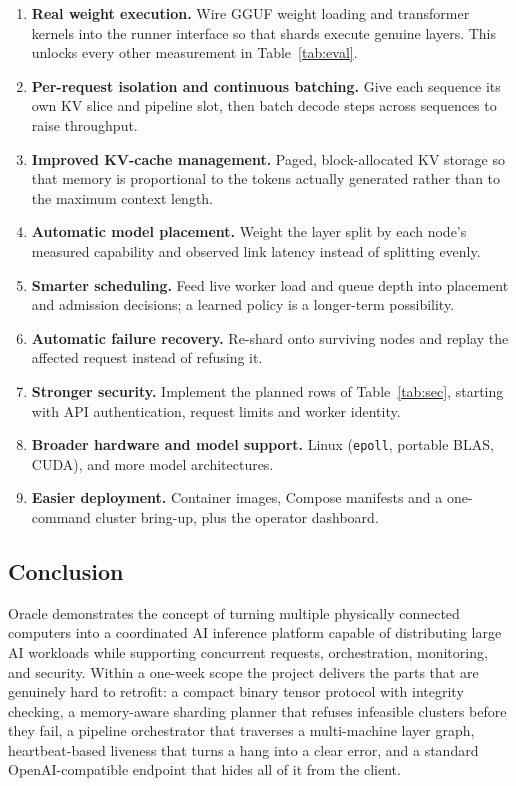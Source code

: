\documentclass[11pt,a4paper]{article}
\begin{document}
\begin{enumerate}[label=\arabic*.]
  \item \textbf{Real weight execution.} Wire GGUF weight loading and transformer
        kernels into the runner interface so that shards execute genuine layers.
        This unlocks every other measurement in Table~\ref{tab:eval}.
  \item \textbf{Per-request isolation and continuous batching.} Give each
        sequence its own KV slice and pipeline slot, then batch decode steps
        across sequences to raise throughput.
  \item \textbf{Improved KV-cache management.} Paged, block-allocated KV storage
        so that memory is proportional to the tokens actually generated rather
        than to the maximum context length.
  \item \textbf{Automatic model placement.} Weight the layer split by each node's
        measured capability and observed link latency instead of splitting evenly.
  \item \textbf{Smarter scheduling.} Feed live worker load and queue depth into
        placement and admission decisions; a learned policy is a longer-term
        possibility.
  \item \textbf{Automatic failure recovery.} Re-shard onto surviving nodes and
        replay the affected request instead of refusing it.
  \item \textbf{Stronger security.} Implement the planned rows of
        Table~\ref{tab:sec}, starting with API authentication, request limits and
        worker identity.
  \item \textbf{Broader hardware and model support.} Linux (\texttt{epoll},
        portable BLAS, CUDA), and more model architectures.
  \item \textbf{Easier deployment.} Container images, Compose manifests and a
        one-command cluster bring-up, plus the operator dashboard.
\end{enumerate}

\subsection{Conclusion}

Oracle demonstrates the concept of turning multiple physically connected
computers into a coordinated AI inference platform capable of distributing large
AI workloads while supporting concurrent requests, orchestration, monitoring, and
security. Within a one-week scope the project delivers the parts that are
genuinely hard to retrofit: a compact binary tensor protocol with integrity
checking, a memory-aware sharding planner that refuses infeasible clusters before
they fail, a pipeline orchestrator that traverses a multi-machine layer graph,
heartbeat-based liveness that turns a hang into a clear error, and a standard
OpenAI-compatible endpoint that hides all of it from the client.
\end{document}

